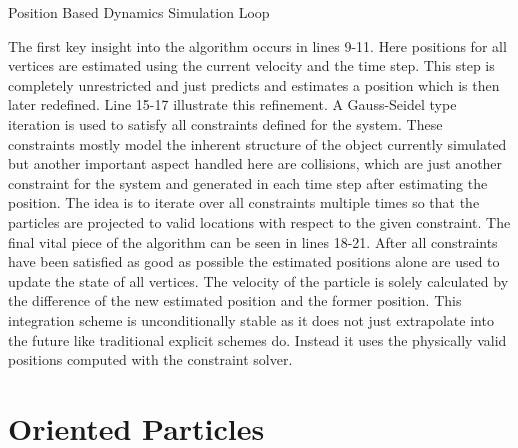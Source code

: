 \begin{algorithm}[htb]
\caption{Position Based Dynamics Simulation Loop}
\begin{algorithmic}[1]
\ENDFOR
\LOOP
	 \ENDFOR
	 \ENDFOR
	  \ENDFOR
	\ENDWHILE
	\ENDFOR
\ENDLOOP
\end{algorithmic}
\end{algorithm}

The first key insight into the algorithm occurs in lines 9-11. Here positions for all vertices are estimated using the current velocity and the time step. This step is completely unrestricted and just predicts and estimates a position which is then later redefined. Line 15-17 illustrate this refinement. A Gauss-Seidel type iteration is used to satisfy all constraints defined for the system. These constraints mostly model the inherent structure of the object currently simulated but another important aspect handled here are collisions, which are just another constraint for the system and generated in each time step after estimating the position. The idea is to iterate over all constraints multiple times so that the particles are projected to valid locations with respect to the given constraint. The final vital piece of the algorithm can be seen in lines 18-21. After all constraints have been satisfied as good as possible the estimated positions alone are used to update the state of all vertices. The velocity of the particle is solely calculated by the difference of the new estimated position and the former position. This integration scheme is unconditionally stable as it does not just extrapolate into the future like traditional explicit schemes do. Instead it uses the physically valid positions computed with the constraint solver.

\clearpage
\section{Oriented Particles}
\label{sec:oriented_particles}

